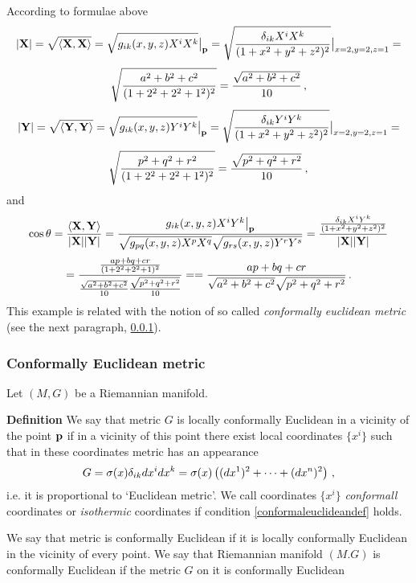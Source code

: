 \documentclass[12pt]{article}
\theoremstyle{theorem}
\numberwithin{equation}{section}
\begin{document}
According to formulae above
    $$
    |{\bf X}|=\sqrt {\langle {\bf X},{\bf X}\rangle}=
  \sqrt {g_{ik}(x,y,z)X^iX^k}\big\vert_{{\bf p}}=
  \sqrt {{\delta_{ik}X^iX^k\over (1+x^2+y^2+z^2)^2}}
\big\vert_{x=2,y=2,z=1}=
    $$
       $$
   {\sqrt {a^2+b^2+c^2\over (1+2^2+2^2+1^2)^2}}=
{\sqrt {a^2+b^2+c^2}\over 10}\,,
       $$
    $$
    |{\bf Y}|=\sqrt {\langle {\bf Y},{\bf Y}\rangle}=
  \sqrt {g_{ik}(x,y,z)Y^iY^k}\big\vert_{{\bf p}}=
  \sqrt {{\delta_{ik}Y^iY^k\over (1+x^2+y^2+z^2)^2}}
\big\vert_{x=2,y=2,z=1}=
    $$
       $$
  \sqrt {{p^2+q^2+r^2\over (1+2^2+2^2+1^2)^2}}=
{\sqrt {p^2+q^2+r^2}\over 10}\,,
       $$
and
          $$
\cos\theta={\langle{\bf X},{\bf Y}\rangle\over |{\bf X}| |{\bf Y}|}
        =
  {g_{ik}(x,y,z)X^iY^k\big\vert_{{\bf p}}\over
\sqrt{g_{pq}(x,y,z)X^pX^q}\sqrt{g_{rs}(x,y,z)Y^rY^s} }
                =
                {
    {\delta_{ik}X^iY^k\over (1+x^2+y^2+z^2)^2}
           \over
      |{\bf X}||{\bf Y}|
              }
             $$
              $$
   ={{ap+bq+cr\over (1+2^2+2^2+1)^2}\over
 {\sqrt {a^2+b^2+c^2}\over 10}{\sqrt {p^2+q^2+r^2}\over 10}}=     
   ={ap+bq+cr
          \over
 \sqrt {a^2+b^2+c^2}\sqrt {p^2+q^2+r^2}} \,.    
          $$
 This example is related with the notion of so called 
{\it conformally euclidean metric} 
(see the next paragraph, \ref{conformally}).


\subsubsection {Conformally Euclidean metric}\label{conformally}


   Let $(M,G)$ be a Riemannian manifold.

\smallskip

  {\bf Definition}  We say that metric 
$G$ is locally conformally Euclidean 
in a vicinity of the point ${\bf p}$
if in a vicinity of this point
there exist local coordinates $\{x^i\}$
such that in these coordinates metric has an appearance
                \begin{equation}\label{conformaleuclideandef}
                  G={\sigma}(x)\delta_{ik}dx^idx^k=
{\sigma}(x)\left((dx^1)^2+\dots+(dx^n)^2\right)\,,
                \end{equation}
i.e. it is proportional to `Euclidean metric'.
 We call coordinates  $\{x^i\}$ {\it conformall} coordinates
or {\it isothermic} coordinates  if condition  
                \eqref{conformaleuclideandef}  holds.  


 
We say that metric is conformally Euclidean if
 it is locally conformally 
Euclidean in the vicinity of every point.
  We say that Riemannian manifold $(M.G)$ is conformally
Euclidean if the metric $G$ on it is conformally Euclidean  
\end{document}

